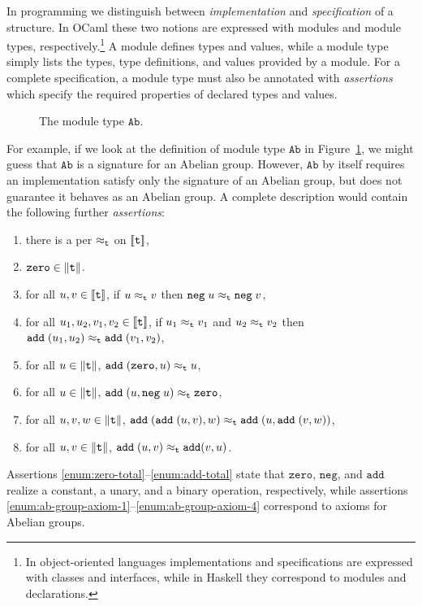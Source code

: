 In programming we distinguish between \emph{implementation} and
\emph{specification} of a structure. In OCaml these two notions are
expressed with modules and module types, respectively.\footnote{In
  object-oriented languages implementations and specifications are
  expressed with classes and interfaces, while in Haskell they
  correspond to modules and declarations.} A module defines types and
values, while a module type simply lists the types, type definitions,
and values provided by a module. For a complete specification, a
module type must also be annotated with \emph{assertions} which
specify the required properties of declared types and values.
\iflong
%
\iflong
%
\begin{figure}[t]
  \centering
  \caption{The module type $\mathtt{Ab}$.}
  \label{fig:module-example}
\end{figure}
%
For example, if we look at the definition of module type $\mathtt{Ab}$
in Figure~\ref{fig:module-example}, we might guess 
that $\mathtt{Ab}$ is a signature for an Abelian group. 
%
However, $\mathtt{Ab}$ by itself requires an implementation satisfy
only the signature of an Abelian
group, but does not guarantee it behaves as an Abelian group.
A complete description would contain the
following further \emph{assertions}:
%
\begin{enumerate}
\item
  \label{enum:t-per}%
  there is a per $\approx_{\mathtt{t}}$ on $[\![\mathtt{t}]\!]$,
\item
  \label{enum:zero-total}%
  $\mathtt{zero} \in \|\mathtt{t}\|$.
\item
  \label{enum:neg-total}%
  for all $u, v \in [\![\mathtt{t}]\!]$, if $u \approx_{\mathtt{t}} v$ then
  $\mathtt{neg} \; u \approx_{\mathtt{t}} \mathtt{neg} \; v$,
\item
  \label{enum:add-total}%
  for all $u_1, u_2, v_1, v_2 \in [\![\mathtt{t}]\!]$, if $u_1
  \approx_{\mathtt{t}} v_1$ and $u_2 \approx_{\mathtt{t}} v_2$ then $\mathtt{add} \; (u_1,
  u_2) \approx_{\mathtt{t}} \mathtt{add} \; (v_1, v_2)$,
\item 
  \label{enum:ab-group-axiom-1}%
  for all $u \in \|\mathtt{t}\|$, $\mathtt{add} \;
  (\mathtt{zero}, u) \approx_{\mathtt{t}} u$,
\item
  \label{enum:ab-group-axiom-2}%
  for all $u \in \|\mathtt{t}\|$, $\mathtt{add} \; (u,
  \mathtt{neg} \; u) \approx_{\mathtt{t}} \mathtt{zero}$,
\item
  \label{enum:ab-group-axiom-3}%
  for all $u, v, w \in \|\mathtt{t}\|$, $\mathtt{add} \;
  (\mathtt{add} \; (u, v), w) \approx_{\mathtt{t}} \mathtt{add} \; (u,
  \mathtt{add} \; (v, w))$,
\item
  \label{enum:ab-group-axiom-4}%
  for all $u, v \in \|\mathtt{t}\|$, $\mathtt{add} \; (u, v)
  \approx_{\mathtt{t}} \mathtt{add} (v, u)$.
\end{enumerate}
%
Assertions \ref{enum:zero-total}--\ref{enum:add-total} state that
$\mathtt{zero}$, $\mathtt{neg}$, and $\mathtt{add}$ realize a
constant, a unary, and a binary operation, respectively, while
assertions \ref{enum:ab-group-axiom-1}--\ref{enum:ab-group-axiom-4}
correspond to axioms for Abelian groups. 
\fi %

